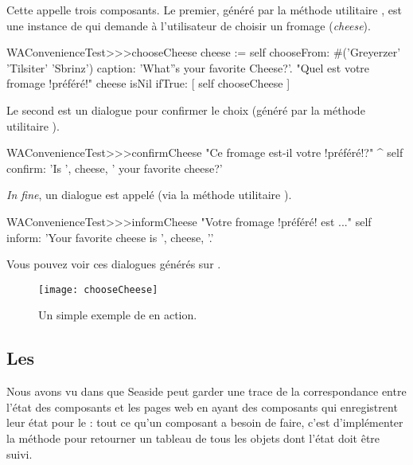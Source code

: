 \documentclass[a4paper,10pt,twoside]{book}
\begin{document}
Cette \task appelle trois composants.
Le premier, généré par la méthode utilitaire
, est une instance de
 qui demande à l'utilisateur de choisir un
fromage (\emph{cheese}).

\begin{code}{}
WAConvenienceTest>>>chooseCheese
	cheese := self
		chooseFrom: #('Greyerzer' 'Tilsiter' 'Sbrinz')
		caption: 'What''s your favorite Cheese?'. "Quel est votre fromage !préféré!"
	cheese isNil ifTrue: [ self chooseCheese ]
\end{code}


Le second est un dialogue  pour confirmer le
choix (généré par la méthode utilitaire ).

\begin{code}{}
WAConvenienceTest>>>confirmCheese
    "Ce fromage est-il votre !préféré!?"
	^ self confirm: 'Is ', cheese,  ' your favorite cheese?'
\end{code}

\emph{In fine}, un dialogue  est appelé (via la
méthode utilitaire ).

\begin{code}{}
WAConvenienceTest>>>informCheese
    "Votre fromage !préféré! est ..."
	self inform: 'Your favorite cheese is ', cheese, '.'
\end{code}

Vous pouvez voir ces dialogues générés sur .

\begin{figure}[ht]
\begin{center}
\texttt{[image: chooseCheese]}
\caption{Un simple exemple de \task en action.}
\end{center}
\end{figure}

\subsection{Les \transactions} %

Nous avons vu dans  que Seaside peut garder une
trace de la correspondance entre l'état des composants et les pages
web en ayant des composants qui enregistrent leur état pour le
\backtracking:
tout ce qu'un composant a besoin de faire, c'est d'implémenter la
méthode  pour retourner un tableau de tous les objets dont
l'état doit être suivi.
\end{document}
